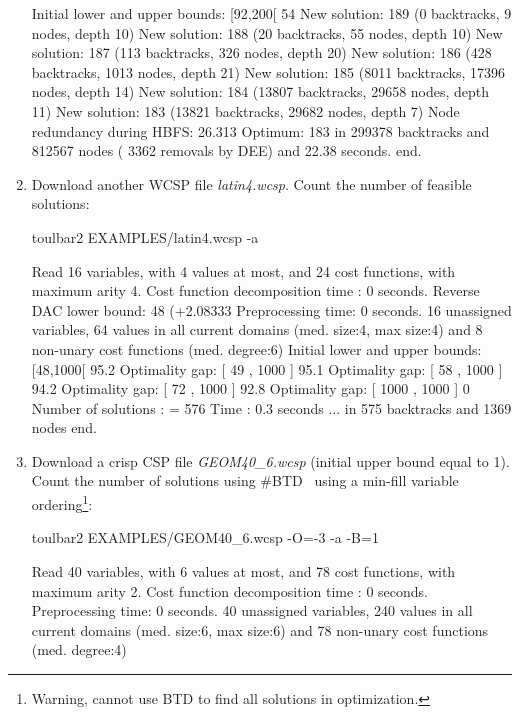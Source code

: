 \begin{enumerate}
{\begin{DoxyCode}
Initial lower and upper bounds: [92,200[ 54%
New solution: 189 (0 backtracks, 9 nodes, depth 10)
New solution: 188 (20 backtracks, 55 nodes, depth 10)
New solution: 187 (113 backtracks, 326 nodes, depth 20)
New solution: 186 (428 backtracks, 1013 nodes, depth 21)
New solution: 185 (8011 backtracks, 17396 nodes, depth 14)
New solution: 184 (13807 backtracks, 29658 nodes, depth 11)
New solution: 183 (13821 backtracks, 29682 nodes, depth 7)
Node redundancy during HBFS: 26.313 %
Optimum: 183 in 299378 backtracks and 812567 nodes ( 3362 removals by DEE) and 22.38 seconds.
end.
\end{DoxyCode}}
\item Download another WCSP file {\em latin4.wcsp}. Count the number of feasible solutions:
\begin{DoxyCode}
	toulbar2 EXAMPLES/latin4.wcsp -a
\end{DoxyCode}
{\scriptsize
\begin{DoxyCode}
Read 16 variables, with 4 values at most, and 24 cost functions, with maximum arity 4.
Cost function decomposition time : 0 seconds.
Reverse DAC lower bound: 48 (+2.08333%
Preprocessing time: 0 seconds.
16 unassigned variables, 64 values in all current domains (med. size:4, max size:4) and 8 non-unary cost functions (med. degree:6)
Initial lower and upper bounds: [48,1000[ 95.2%
Optimality gap: [ 49 , 1000 ] 95.1 %
Optimality gap: [ 58 , 1000 ] 94.2 %
Optimality gap: [ 72 , 1000 ] 92.8 %
Optimality gap: [ 1000 , 1000 ] 0 %
Number of solutions    : =  576
Time                   :    0.3 seconds
... in 575 backtracks and 1369 nodes
end.
\end{DoxyCode}}
\item Download a crisp CSP file {\em GEOM40\_6.wcsp} (initial upper bound equal to 1). Count the number of solutions using \#BTD~\cite{Favier09a} using a min-fill variable ordering\footnote{Warning, cannot use BTD to find all solutions in optimization.}:
\begin{DoxyCode}
	toulbar2 EXAMPLES/GEOM40_6.wcsp -O=-3 -a -B=1
\end{DoxyCode}
{\scriptsize
\begin{DoxyCode}
Read 40 variables, with 6 values at most, and 78 cost functions, with maximum arity 2.
Cost function decomposition time : 0 seconds.
Preprocessing time: 0 seconds.
40 unassigned variables, 240 values in all current domains (med. size:6, max size:6) and 78 non-unary cost functions (med. degree:4)

\end{DoxyCode}}
\end{enumerate}
